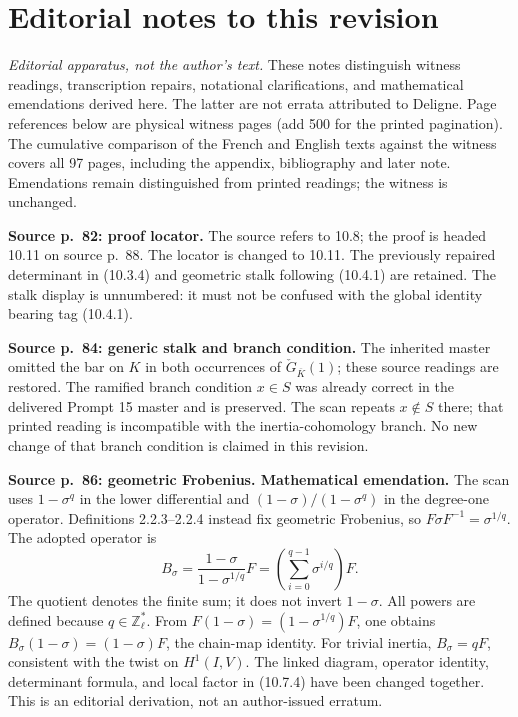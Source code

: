 \documentclass[10pt,letterpaper]{article}
\newcommand{\Z}{\mathbb Z}
\begin{document}
\section*{Editorial notes to this revision}
\noindent\textit{Editorial apparatus, not the author's text.}
These notes distinguish witness readings, transcription repairs, notational
clarifications, and mathematical emendations derived here. The latter are not
errata attributed to Deligne. Page references below are physical witness pages
(add 500 for the printed pagination). The cumulative comparison of the French and English
texts against the witness covers all 97 pages, including the appendix, bibliography and
later note. Emendations remain distinguished from printed readings; the witness is unchanged.

\begin{description}[style=nextline,leftmargin=2.6em,labelwidth=2.2em,font=\normalfont\bfseries]
\item[E01] \textbf{Source p.~82: proof locator.} The source refers to 10.8; the proof is headed 10.11 on source p.~88. The locator is changed to 10.11. The previously repaired determinant in (10.3.4) and geometric stalk following (10.4.1) are retained. The stalk display is unnumbered: it must not be confused with the global identity bearing tag (10.4.1).

\item[E02] \textbf{Source p.~84: generic stalk and branch condition.} The inherited master omitted the bar on \(K\) in both occurrences of \(\check G_{\overline K}(1)\); these source readings are restored. The ramified branch condition \(x\in S\) was already correct in the delivered Prompt 15 master and is preserved. The scan repeats \(x\notin S\) there; that printed reading is incompatible with the inertia-cohomology branch. No new change of that branch condition is claimed in this revision.

\item[E03] \textbf{Source p.~86: geometric Frobenius. Mathematical emendation.} The scan uses \(1-\sigma^q\) in the lower differential and \((1-\sigma)/(1-\sigma^q)\) in the degree-one operator. Definitions 2.2.3--2.2.4 instead fix geometric Frobenius, so \(F\sigma F^{-1}=\sigma^{1/q}\). The adopted operator is
\[
 B_\sigma=\frac{1-\sigma}{1-\sigma^{1/q}}F=\left(\sum_{i=0}^{q-1}\sigma^{i/q}\right)F.
\]
The quotient denotes the finite sum; it does not invert \(1-\sigma\). All powers are defined because \(q\in\Z_\ell^*\). From \(F(1-\sigma)=(1-\sigma^{1/q})F\), one obtains \(B_\sigma(1-\sigma)=(1-\sigma)F\), the chain-map identity. For trivial inertia, \(B_\sigma=qF\), consistent with the twist on \(H^1(I,V)\). The linked diagram, operator identity, determinant formula, and local factor in (10.7.4) have been changed together. This is an editorial derivation, not an author-issued erratum.


\end{description}
\end{document}

